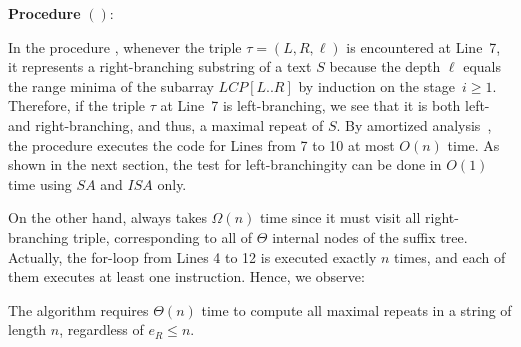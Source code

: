 {
  \setlength{\interspacetitleruled}{0pt}%
  \setlength{\algotitleheightrule}{0pt}%
  \begin{algorithm}[h]
  \textbf{Procedure} \BUSA$()$:\\
  \end{algorithm}
}  

In the procedure \BUSA{}, whenever the triple $\tau = (L, R, \ell)$ is encountered at Line~7, it represents a right-branching substring of a text $S$ because
the depth $\ell$ equals the range minima of the subarray $LCP[L..R]$ by induction on the stage~$i\ge 1$. Therefore, if the triple $\tau$ at Line~7 is left-branching, we see that it is both left- and right-branching, and thus, a maximal repeat of $S$. By amortized analysis~\cite{kasai:lee2001lcp:linear}, the procedure executes the code for Lines from 7 to 10 at most $O(n)$ time.
As shown in the next section, the test for left-branchingity can be done in $O(1)$ time using $SA$ and $ISA$ only.

On the other hand, \BUSA{} always takes $\Omega(n)$ time since it must visit all right-branching triple, corresponding to all of $\Theta$ internal nodes of the suffix tree. Actually, the for-loop from Lines 4 to 12 is executed exactly $n$ times, and each of them executes at least one instruction. Hence, we observe: 


\begin{remark}
\label{rem:lb:busa}  
  The algorithm \BUSA{} requires $\Theta(n)$ time to compute all maximal repeats in a string of length $n$, regardless of $e_R \le n$. 
\end{remark}


